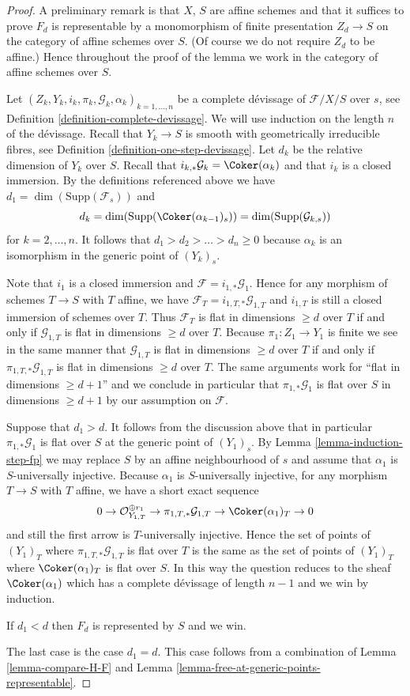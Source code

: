 \begin{proof}
A preliminary remark is that $X$, $S$ are affine schemes and that it
suffices to prove $F_d$ is representable by a monomorphism of finite
presentation $Z_d \to S$ on the category of affine schemes over $S$.
(Of course we do not require $Z_d$ to be affine.)
Hence throughout the proof of
the lemma we work in the category of affine schemes over $S$.

\medskip\noindent
Let $(Z_k, Y_k, i_k, \pi_k, \mathcal{G}_k, \alpha_k)_{k = 1, \ldots, n}$
be a complete d\'evissage of $\mathcal{F}/X/S$ over $s$, see
Definition \ref{definition-complete-devissage}.
We will use induction on the length $n$ of the d\'evissage.
Recall that $Y_k \to S$ is smooth with geometrically irreducible fibres, see
Definition \ref{definition-one-step-devissage}.
Let $d_k$ be the relative dimension of $Y_k$ over $S$.
Recall that $i_{k, *}\mathcal{G}_k = \Coker(\alpha_k)$ and
that $i_k$ is a closed immersion.
By the definitions referenced above we have
$d_1 = \dim(\text{Supp}(\mathcal{F}_s))$ and
$$
d_k = \dim(\text{Supp}(\Coker(\alpha_{k - 1})_s))
= \dim(\text{Supp}(\mathcal{G}_{k, s}))
$$
for $k = 2, \ldots, n$. It follows that $d_1 > d_2 > \ldots > d_n \geq 0$
because $\alpha_k$ is an isomorphism in the generic point of $(Y_k)_s$.

\medskip\noindent
Note that $i_1$ is a closed immersion and
$\mathcal{F} = i_{1, *}\mathcal{G}_1$.
Hence for any morphism of schemes $T \to S$ with $T$ affine,
we have $\mathcal{F}_T = i_{1, T, *}\mathcal{G}_{1, T}$ and
$i_{1, T}$ is still a closed immersion of schemes over $T$.
Thus $\mathcal{F}_T$ is flat in dimensions $\geq d$ over $T$
if and only if $\mathcal{G}_{1, T}$ is flat in dimensions $\geq d$ over $T$.
Because $\pi_1 : Z_1 \to Y_1$ is finite we see in the same manner that
$\mathcal{G}_{1, T}$ is flat in dimensions $\geq d$ over $T$
if and only if $\pi_{1, T, *}\mathcal{G}_{1, T}$ is flat in dimensions
$\geq d$ over $T$. The same arguments work for
``flat in dimensions $\geq d + 1$'' and we conclude in particular that
$\pi_{1, *}\mathcal{G}_1$ is flat over $S$ in dimensions $\geq d + 1$
by our assumption on $\mathcal{F}$.

\medskip\noindent
Suppose that $d_1 > d$. It follows from the discussion above that
in particular $\pi_{1, *}\mathcal{G}_1$ is flat over $S$ at
the generic point of $(Y_1)_s$. By
Lemma \ref{lemma-induction-step-fp}
we may replace $S$ by an affine neighbourhood of $s$ and assume that
$\alpha_1$ is $S$-universally injective. Because $\alpha_1$ is
$S$-universally injective, for any morphism $T \to S$ with $T$ affine,
we have a short exact sequence
$$
0 \to \mathcal{O}_{Y_{1, T}}^{\oplus r_1}
\to \pi_{1, T, *}\mathcal{G}_{1, T} \to \Coker(\alpha_1)_T \to 0
$$
and still the first arrow is $T$-universally injective. Hence the set
of points of $(Y_1)_T$ where $\pi_{1, T, *}\mathcal{G}_{1, T}$ is flat over
$T$ is the same as the set of points of $(Y_1)_T$ where
$\Coker(\alpha_1)_T$ is flat over $S$. In this way the question
reduces to the sheaf $\Coker(\alpha_1)$ which has a complete
d\'evissage of length $n - 1$ and we win by induction.

\medskip\noindent
If $d_1 < d$ then $F_d$ is represented by $S$ and we win.

\medskip\noindent
The last case is the case $d_1 = d$. This case follows from a combination of
Lemma \ref{lemma-compare-H-F}
and
Lemma \ref{lemma-free-at-generic-points-representable}.
\end{proof}
